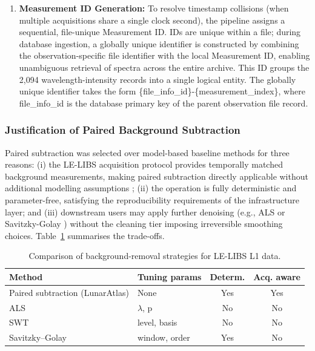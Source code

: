 \documentclass[final,5p,twocolumn,a4paper]{elsarticle}
\begin{document}
\begin{enumerate}
    \item \textbf{Measurement ID Generation:} To resolve timestamp collisions (when multiple acquisitions share a single clock second), the pipeline assigns a sequential, file-unique Measurement ID. IDs are unique within a file; during database ingestion, a globally unique identifier is constructed by combining the observation-specific file identifier with the local Measurement ID, enabling unambiguous retrieval of spectra across the entire archive. This ID groups the 2,094 wavelength-intensity records into a single logical entity. The globally unique identifier takes the form \{file\_info\_id\}-\{measurement\_index\}, where file\_info\_id is the database primary key of the parent observation file record.
\end{enumerate}




\subsubsection{Justification of Paired Background Subtraction}
Paired subtraction was selected over model-based baseline methods for three reasons: (i) the LE-LIBS acquisition protocol provides temporally matched background measurements, making paired subtraction directly applicable without additional modelling assumptions \cite{sridhar2024libs}; (ii) the operation is fully deterministic and parameter-free, satisfying the reproducibility requirements of the infrastructure layer; and (iii) downstream users may apply further denoising (e.g., ALS \cite{eilers2003perfect} or Savitzky-Golay \cite{savitzky1964}) without the cleaning tier imposing irreversible smoothing choices. Table~\ref{table:subtraction_tradeoffs} summarises the trade-offs.

\begin{table}[!htbp]
\centering
\footnotesize
\setlength{\tabcolsep}{4pt}
\begin{tabular}{@{}lp{1.6cm}cc@{}}
\toprule
\textbf{Method} & \textbf{Tuning params} & \textbf{Determ.} & \textbf{Acq. aware} \\
\midrule
Paired subtraction (LunarAtlas) & None & Yes & Yes \\
ALS \cite{eilers2003perfect} & $\lambda$, p & No & No \\
SWT \cite{nason1995stationary} & level, basis & No & No \\
Savitzky--Golay \cite{savitzky1964} & window, order & Yes & No \\
\bottomrule
\end{tabular}
\caption{Comparison of background-removal strategies for LE-LIBS L1 data.}
\label{table:subtraction_tradeoffs}
\end{table}
\end{document}
